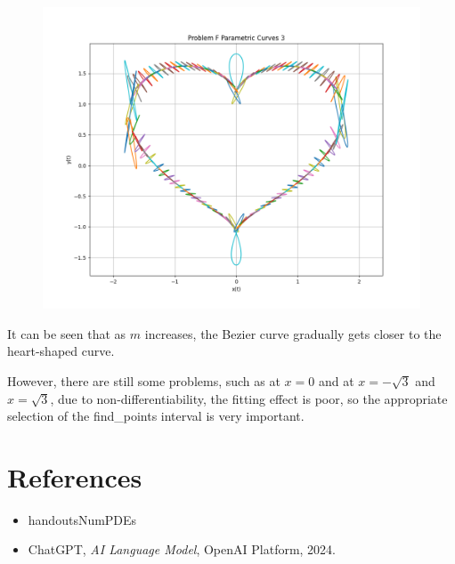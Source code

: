 \documentclass[a4paper]{article}
\begin{document}
\begin{figure}[h]
    \centering
    \includegraphics[width=0.5\linewidth]{Pictures/ProblemF_3.png}
    
\end{figure}

It can be seen that as \( m \) increases, the Bezier curve gradually gets closer to the heart-shaped curve.

However, there are still some problems, such as at \( x=0 \) and at \( x = -\sqrt3 \) and \( x = \sqrt3 \), due to non-differentiability, the fitting effect is poor, so the appropriate selection of the find\_points interval is very important.

\section*{References}
\begin{itemize}
   \item handoutsNumPDEs
   \item ChatGPT, \textit{AI Language Model}, OpenAI Platform, 2024.
\end{itemize}
\end{document}
